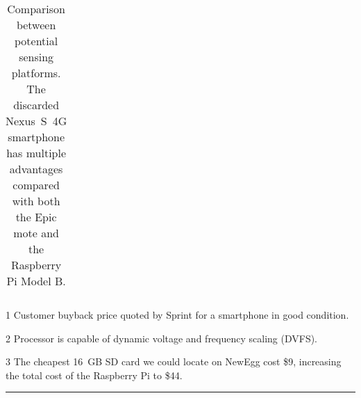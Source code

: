 \begin{table*}[t]
\begin{threeparttable}
{\begin{tabularx}{\textwidth}{rXXX}
\end{tabularx}
}
{\footnotesize
\begin{tablenotes}
\item [1] Customer buyback price quoted by Sprint for a smartphone in good
condition.
\item [2] Processor is capable of dynamic voltage and frequency scaling
(DVFS).
\item [3] The cheapest 16~GB SD card we could locate on NewEgg cost \$9,
increasing the total cost of the Raspberry Pi to \$44.

\end{tablenotes}
}

\vspace*{-0.1in}

\caption{Comparison between potential sensing platforms. \textnormal{The
discarded Nexus~S~4G smartphone has multiple advantages compared with both
the Epic mote and the Raspberry Pi Model B.}}

\vspace*{0.1in}
\hrule
\vspace*{-0.2in}

\end{threeparttable}
\label{table-comparison}
\end{table*}

